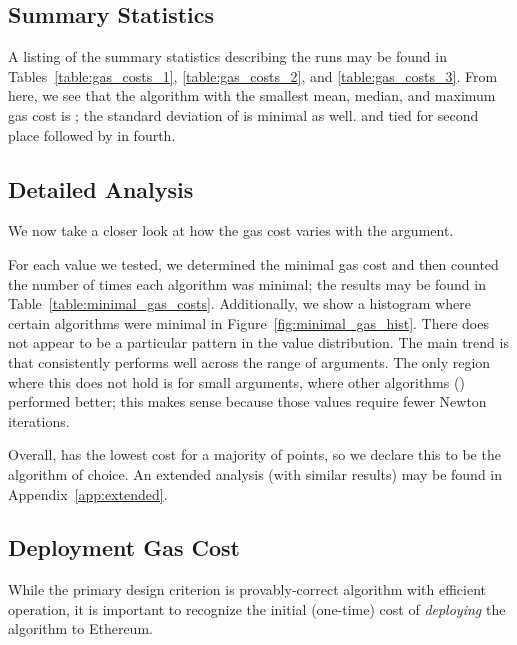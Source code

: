 \subsection{Summary Statistics}





A listing of the summary statistics describing the runs
may be found in Tables~\ref{table:gas_costs_1},
\ref{table:gas_costs_2}, and \ref{table:gas_costs_3}.
From here, we see that the algorithm with the smallest
mean, median, and maximum gas cost is \UnrolledThree{};
the standard deviation of \UnrolledThree{} is minimal as well.
\UnrolledOne{} and \UnrolledTwo{} tied for second place
followed by \Linear{} in fourth.


\subsection{Detailed Analysis}

We now take a closer look at how the gas cost varies
with the argument.

For each value we tested,
we determined the minimal gas cost
and then counted the number of times each algorithm was minimal;
the results may be found in Table~\ref{table:minimal_gas_costs}.
Additionally, we show a histogram where certain algorithms
were minimal in Figure~\ref{fig:minimal_gas_hist}.
There does not appear to be a particular pattern
in the value distribution.
The main trend is that \UnrolledThree{}
consistently performs well across the range of arguments.
The only region where this does not hold is for small arguments,
where other algorithms (\while{}) performed better;
this makes sense because those values require fewer Newton iterations.

Overall, \UnrolledThree{} has the lowest cost
for a majority of points,
so we declare this to be the algorithm of choice.
An extended analysis (with similar results) may be found in
Appendix~\ref{app:extended}.





\subsection{Deployment Gas Cost}

While the primary design criterion is provably-correct algorithm
with efficient operation,
it is important to recognize the initial (one-time) cost
of \emph{deploying} the algorithm to Ethereum.

